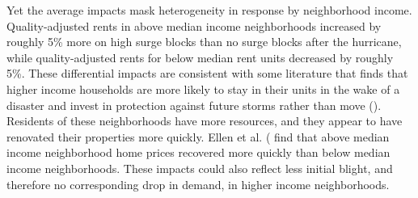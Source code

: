 \documentclass[12pt]{article}
\begin{document}
Yet the average impacts mask heterogeneity in response by neighborhood income.  Quality-adjusted rents in above median income neighborhoods increased by roughly 5\% more on high surge blocks than no surge blocks after the hurricane, while quality-adjusted rents for below median rent units decreased by roughly 5\%.  These differential impacts are consistent with some literature that finds that higher income households are more likely to stay in their units in the wake of a disaster and invest in protection against future storms rather than move (\cite{smith_adjusting_2006}).  Residents of these neighborhoods have more resources, and they appear to have renovated their properties more quickly. Ellen et al. (\citeyear{ellen_heterogeneity_2022} find that above median income neighborhood home prices recovered more quickly than below median income neighborhoods. These impacts could also reflect less initial blight, and therefore no corresponding drop in demand, in higher income neighborhoods. 






\end{document}
